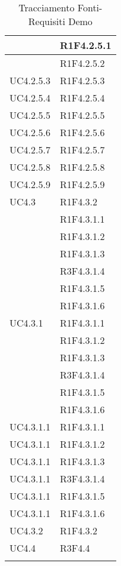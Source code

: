 \begin{longtable}{|>{\centering}m{5cm}|m{5cm}<{\centering}|}
{UC4.2.5.1}&{R1F4.2.5.1}\\ \hline
{UC4.2.5.2}&{R1F4.2.5.2}\\ \hline
{UC4.2.5.3}&{R1F4.2.5.3}\\ \hline
{UC4.2.5.4}&{R1F4.2.5.4}\\ \hline
{UC4.2.5.5}&{R1F4.2.5.5}\\ \hline
{UC4.2.5.6}&{R1F4.2.5.6}\\ \hline
{UC4.2.5.7}&{R1F4.2.5.7}\\ \hline
{UC4.2.5.8}&{R1F4.2.5.8}\\ \hline
{UC4.2.5.9}&{R1F4.2.5.9}\\ \hline

{UC4.3}&{R1F4.3.2}\\
&{R1F4.3.1.1}\\
&{R1F4.3.1.2}\\
&{R1F4.3.1.3}\\
&{R3F4.3.1.4}\\
&{R1F4.3.1.5}\\
&{R1F4.3.1.6}\\ \hline
{UC4.3.1}&{R1F4.3.1.1}\\
&{R1F4.3.1.2}\\
&{R1F4.3.1.3}\\
&{R3F4.3.1.4}\\
&{R1F4.3.1.5}\\
&{R1F4.3.1.6}\\ \hline
{UC4.3.1.1}&{R1F4.3.1.1}\\ \hline
{UC4.3.1.1}&{R1F4.3.1.2}\\ \hline
{UC4.3.1.1}&{R1F4.3.1.3}\\ \hline
{UC4.3.1.1}&{R3F4.3.1.4}\\ \hline
{UC4.3.1.1}&{R1F4.3.1.5}\\ \hline
{UC4.3.1.1}&{R1F4.3.1.6}\\ \hline
{UC4.3.2}&{R1F4.3.2}\\ \hline
{UC4.4}&{R3F4.4}\\ \hline

\caption[Tracciamento Fonti-Requisiti Demo]{Tracciamento Fonti-Requisiti Demo}
\label{tabella: Tracciamento Fonti-Requisiti Demo}
\end{longtable}
\newpage
